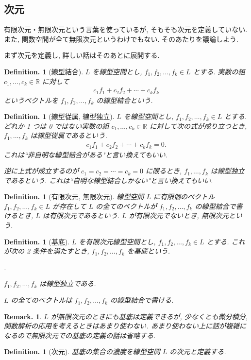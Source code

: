 \documentclass[openany, a4paper, oneside]{jsbook}
\newcounter{enum2}
\renewenvironment{enumerate}{%
\begin{list}%
{%
\arabic{enum2}.\ \,%
}%
{%
\usecounter{enum2}
\setlength{\itemindent}{0pt}%
\setlength{\leftmargin}{15pt}%
\setlength{\rightmargin}{0pt}%
\setlength{\labelsep}{0pt}%
\setlength{\labelwidth}{6pt}%
\setlength{\itemsep}{0pt}%
\setlength{\parsep}{0pt}%
\setlength{\listparindent}{0pt}%
}
}{%
\end{list}%
}
\theoremstyle{break}
\theoremstyle{breakdefn}
\newtheorem{defn}[thm]{Definition.}
\newtheorem{rem}[thm]{Remark.}
\newcommand{\bbR}{\mathbb{R}}
\begin{document}
\subsection{次元}


有限次元・無限次元という言葉を使っているが, そもそも次元を定義していない.
また, 関数空間が全て無限次元というわけでもない.
そのあたりを議論しよう.

まず次元を定義し, 詳しい話はそのあとに展開する.
\begin{defn}[線型結合]
$L$ を線型空間とし,
$f_1, f_2, \dots, f_k \in L$ とする.
実数の組 $c_1, \dots, c_k \in \bbR$ に対して
\begin{align}
 c_1 f_1 + c_2 f_2 + \cdots + c_k f_k
\end{align}
というベクトルを $f_1, f_2, \dots, f_k$ の線型結合という.
\end{defn}
\begin{defn}[線型従属, 線型独立]
$L$ を線型空間とし,
$f_1, f_2, \dots, f_k \in L$ とする.
どれか 1 つは 0 ではない実数の組 $c_1, \dots, c_k \in \bbR$ に対して次の式が成り立つとき,
$f_1, \dots, f_k$ は線型従属であるという.
\begin{align}
 c_1 f_1 + c_2 f_2 + \cdots + c_k f_k = 0.
\end{align}
これは``非自明な線型結合がある"と言い換えてもいい.

逆に上式が成立するのが $c_1 = c_2 = \cdots = c_k = 0$ に限るとき,
$f_1, \dots, f_k$ は線型独立であるという.
これは``自明な線型結合しかない"と言い換えてもいい.
\end{defn}
\begin{defn}[有限次元, 無限次元]
線型空間 $L$ に有限個のベクトル $f_1, f_2, \dots, f_k \in L$ が存在して
$L$ の全てのベクトルが $f_1, f_2, \dots, f_k$ の線型結合で書けるとき,
$L$ は有限次元であるという.
$L$ が有限次元でないとき, 無限次元という.
\end{defn}
\begin{defn}[基底]
$L$ を有限次元線型空間とし, $f_1, f_2, \dots, f_k \in L$ とする.
これが次の 2 条件を満たすとき, $f_1, f_2, \dots, f_k$ を基底という.
\begin{enumerate}
\item $f_1, f_2, \dots, f_k$ は線型独立である.
\item $L$ の全てのベクトルは $f_1, f_2, \dots, f_k$ の線型結合で書ける.
\end{enumerate}
\end{defn}
\begin{rem}
$L$ が無限次元のときにも基底は定義できるが,
少なくとも微分積分, 関数解析の応用を考えるときはあまり使わない.
あまり使わない上に話が複雑になるので無限次元での基底の定義の話は省略する.
\end{rem}
\begin{defn}[次元]
基底の集合の濃度を線型空間 $L$ の次元と定義する.
\end{defn}
\end{document}
